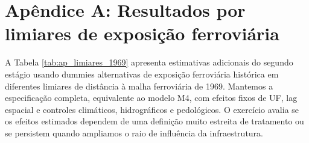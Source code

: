 \documentclass[12pt,a4paper]{article}
\begin{document}
\section*{Apêndice A: Resultados por limiares de exposição ferroviária}

A Tabela \ref{tab:ap_limiares_1969} apresenta estimativas adicionais do segundo estágio usando dummies alternativas de exposição ferroviária histórica em diferentes limiares de distância à malha ferroviária de 1969. Mantemos a especificação completa, equivalente ao modelo M4, com efeitos fixos de UF, lag espacial e controles climáticos, hidrográficos e pedológicos. O exercício avalia se os efeitos estimados dependem de uma definição muito estreita de tratamento ou se persistem quando ampliamos o raio de influência da infraestrutura.
\end{document}
